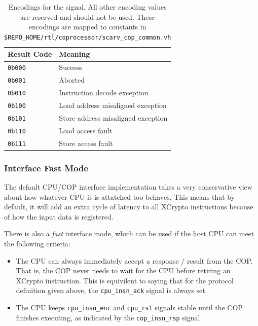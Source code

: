 \documentclass{scarv-report}
\begin{document}
\begin{table}[h!]
\centering
\begin{tabular}{ll}
\toprule
{\bf Result Code} & {\bf Meaning} \\
\midrule
 {\tt 0b000}  & Success \\
 {\tt 0b001}  & Aborted \\
 {\tt 0b010}  & Instruction decode exception \\
 {\tt 0b100}  & Load address misaligned exception  \\
 {\tt 0b101}  & Store address misaligned exception \\
 {\tt 0b110}  & Load access fault                  \\
 {\tt 0b111}  & Store access fault                 \\
 \bottomrule
\end{tabular}
\caption{Encodings for the  signal. All other encoding
values are reserved and should not be used. These encodings are
mapped to constants in {\tt \$REPO\_HOME/rtl/coprocessor/scarv\_cop\_common.vh}}
\label{tab:cop-result-encodings}
\end{table}

\subsubsection{Interface Fast Mode}

The default CPU/COP interface implementation takes a very conservative
view about how whatever CPU it is attatched too behaves.
This means that by default, it will add an extra cycle of latency to all
XCrypto instructions because of how the input data is registered.

There is also a {\em fast} interface mode, which can be used if the host
CPU can meet the following criteria:

\begin{itemize}
\item The CPU can always immediately accept a response / result from the
    COP. That is, the COP never needs to wait for the CPU before
    retiring an XCrypto instruction.
    This is equivilent to saying that for the protocol definition
    given above, the {\tt cpu\_insn\_ack} signal is always set.
\item The CPU keeps {\tt cpu\_insn\_enc} and {\tt cpu\_rs1} signals
    stable until the COP finishes executing, as indicated by the
    {\tt cop\_insn\_rsp} signal.
\end{itemize}
\end{document}
